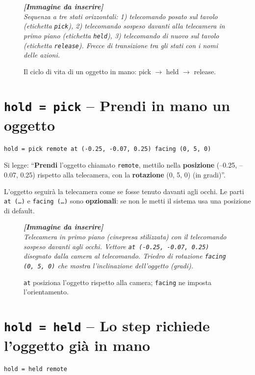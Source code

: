 ﻿\documentclass[a4paper,12pt,oneside]{book}
\newcommand{\imgph}[2]{%
  \begin{tcolorbox}[colback=cvtlightblue!30,colframe=cvtblue!40,%
    width=#1,halign=center,valign=center,height=5cm,boxrule=0.5pt,arc=3pt]%
    \textcolor{cvtgray}{\itshape\footnotesize\textbf{[Immagine da inserire]}\\[3pt]#2}%
  \end{tcolorbox}}
\begin{document}
\begin{figure}[H]
  \centering
  \imgph{13cm}{Sequenza a tre stati orizzontali: 1) telecomando posato sul tavolo (etichetta \texttt{pick}), 2) telecomando sospeso davanti alla telecamera in primo piano (etichetta \texttt{held}), 3) telecomando di nuovo sul tavolo (etichetta \texttt{release}). Frecce di transizione tra gli stati con i nomi delle azioni.}
  \caption{Il ciclo di vita di un oggetto in mano: pick $\rightarrow$ held $\rightarrow$ release.}
  \label{fig:hold-ciclo}
\end{figure}

\section{\texttt{hold = pick} -- Prendi in mano un oggetto}

\begin{lstlisting}
hold = pick remote at (-0.25, -0.07, 0.25) facing (0, 5, 0)
\end{lstlisting}

Si legge: ``\textbf{Prendi} l'oggetto chiamato \texttt{remote}, mettilo nella
\textbf{posizione} (--0.25, --0.07, 0.25) rispetto alla telecamera, con la
\textbf{rotazione} (0, 5, 0) (in gradi)''.

L'oggetto seguirà la telecamera come se fosse tenuto davanti agli occhi. Le
parti \texttt{at (\ldots)} e \texttt{facing (\ldots)} sono \textbf{opzionali}:
se non le metti il sistema usa una posizione di default.

\begin{figure}[H]
  \centering
  \imgph{11cm}{Telecamera in primo piano (cinepresa stilizzata) con il telecomando sospeso davanti agli occhi. Vettore \texttt{at (-0.25, -0.07, 0.25)} disegnato dalla camera al telecomando. Triedro di rotazione \texttt{facing (0, 5, 0)} che mostra l'inclinazione dell'oggetto (gradi).}
  \caption{\texttt{at} posiziona l'oggetto rispetto alla camera; \texttt{facing} ne imposta l'orientamento.}
  \label{fig:hold-at-facing}
\end{figure}

\section{\texttt{hold = held} -- Lo step richiede l'oggetto già in mano}

\begin{lstlisting}
hold = held remote
\end{lstlisting}
\end{document}
